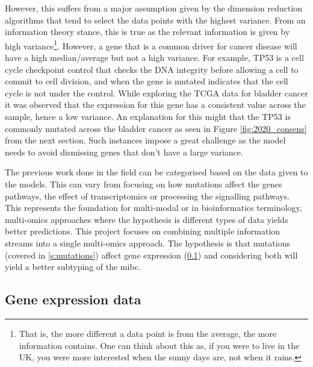 However, this suffers from a major assumption given by the dimension reduction algorithms that tend to select the data points with the highest variance. From an information theory stance, this is true as the relevant information is given by high variance\footnote{That is, the more different a data point is from the average, the more information contains. One can think about this as, if you were to live in the UK, you were more interested when the sunny days are, not when it rains.}. However, a gene that is a common driver for cancer disease will have a high median/average but not a high variance. For example, TP53 is a cell cycle checkpoint control that checks the DNA integrity before allowing a cell to commit to cell division, and when the gene is mutated indicates that the cell cycle is not under the control. While exploring the TCGA data for bladder cancer \cite{Tcga2018-sj,Robertson2017-mg} it was observed that the expression for this gene has a consistent value across the sample, hence a low variance. An explanation for this might that the TP53 is commonly mutated across the bladder cancer as seen in Figure \ref{fig:2020_consens} from the next section. Such instances impose a great challenge as the model needs to avoid dismissing genes that don't have a large variance.


The previous work done in the field can be categorised based on the data given to the models. This can vary from focusing on how mutations affect the genes pathways, the effect of transcriptomics or processing the signalling pathways. This represents the foundation for multi-modal or in bioinformatics terminology, multi-omics approaches where the hypothesis is different types of data yields better predictions. This project focuses on combining multiple information streams into a single multi-omics approach. The hypothesis is that mutations (covered in \ref{s:mutations}) affect gene expression (\ref{s:rnaSeq}) and considering both will yield a better subtyping of the \acrlong{mibc}.

\subsection{Gene expression data} \label{s:rnaSeq}

\vspace{3mm}
\vspace{3mm}

